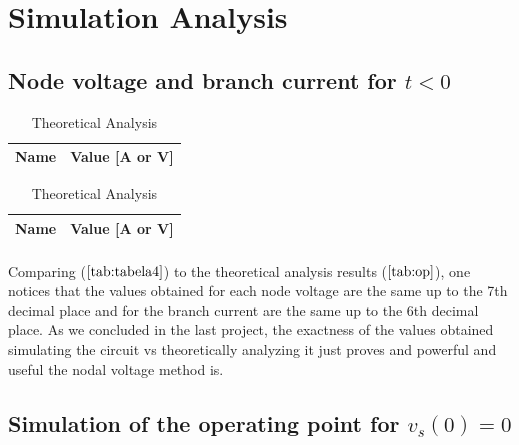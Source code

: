 \section{Simulation Analysis}
\label{sec:simulation}


\subsection{Node voltage and branch current for $t<0$} \label{3.1}


\begin{table}[!htb]
  \begin{minipage}{.5\linewidth}
    \centering
    \caption{Simulation Analysis}
    \begin{tabular}{|l|l|}
      \hline
      {\bf Name} & {\bf Value [A or V]} \\ \hline
      
    \end{tabular}
    \label{tab:tabela4}
  \end{minipage}%
  \begin{minipage}{0.5\linewidth}
    \centering
    \caption{Theoretical Analysis}
    \begin{tabular}{|l|l|}
      \hline
      {\bf Name} & {\bf Value [A or V]} \\ \hline
      
    \end{tabular}
  \end{minipage}
\end{table}

\paragraph{} Comparing ($\ref{tab:tabela4}$) to the theoretical analysis results ($\ref{tab:op}$), one notices that the values obtained for each
node voltage are the same up to the 7th decimal place and for the branch current are the same up to the 6th
decimal place. As we concluded in the last project, the exactness of the values obtained simulating the circuit
vs theoretically analyzing it just proves and powerful and useful the nodal voltage method is.


\subsection{Simulation of the operating point for $v_s(0)=0$} \label{3.2}


